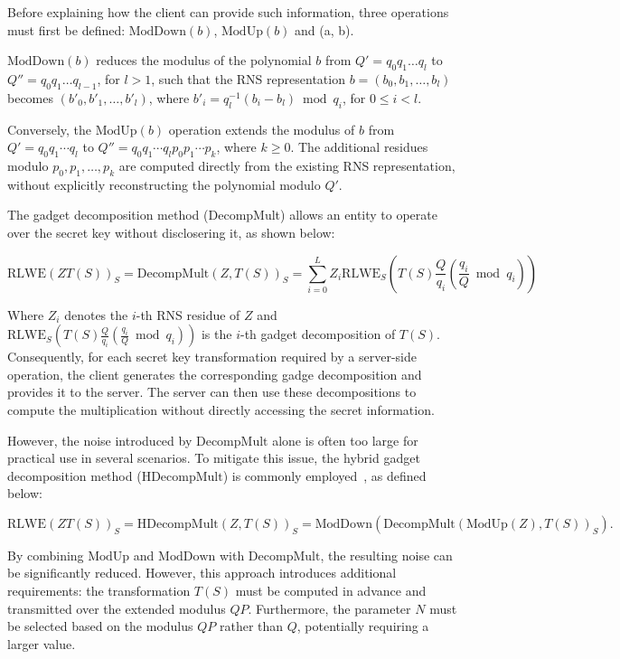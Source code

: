 Before explaining how the client can provide such information, three operations must first be defined: $\text{ModDown}(b)$, $\text{ModUp}(b)$ and (a, b).

$\text{ModDown}(b)$ reduces the modulus of the polynomial $b$ from $Q' = q_0q_1\ldots q_l$ to $Q''=q_0q_1\ldots q_{l-1}$, for $l>1$, such that the RNS representation $b=(b_0,b_1,\ldots,b_l)$ becomes $(b'_0, b'_1, \ldots, b'_l)$, where $b'_i=q_l^{-1}(b_i - b_l) \bmod q_i$, for $0 \leq i < l$.

Conversely, the $\text{ModUp}(b)$ operation extends the modulus of $b$ from $Q'=q_0q_1\cdots q_l$ to $Q''=q_0q_1\cdots q_lp_0p_1\cdots p_k$, where $k\geq0$. The additional residues modulo $p_0,p_1,\ldots,p_k$ are computed directly from the existing RNS representation, without explicitly reconstructing the polynomial modulo $Q'$.

The gadget decomposition method (DecompMult) allows an entity to operate over the secret key without disclosering it, as shown below:

\begin{equation*}
    \text{RLWE}(ZT(S))_S = \text{DecompMult}(Z, T(S))_S = \sum_{i=0}^LZ_i\text{RLWE}_S\left(T(S)\frac{Q}{q_i}\left( \frac{q_i}{Q} \bmod q_i \right)\right)
\end{equation*}

Where $Z_i$ denotes the $i$-th RNS residue of $Z$ and $\text{RLWE}_S\left(T(S)\frac{Q}{q_i}\left( \frac{q_i}{Q} \bmod q_i \right)\right)$ is the $i$-th gadget decomposition of $T(S)$. Consequently, for each secret key transformation required by a server-side operation, the client generates the corresponding gadge decomposition and provides it to the server. The server can then use these decompositions to compute the multiplication without directly accessing the secret information.

However, the noise introduced by $\text{DecompMult}$ alone is often too large for practical use in several scenarios. To mitigate this issue, the hybrid gadget decomposition method ($\text{HDecompMult}$) is commonly employed~\cite{han2020better}, as defined below:

\begin{equation*}
    \text{RLWE}(ZT(S))_S = \text{HDecompMult}(Z, T(S))_S = \text{ModDown}(\text{DecompMult}(\text{ModUp}(Z), T(S))_S).
\end{equation*}

By combining $\text{ModUp}$ and $\text{ModDown}$ with $\text{DecompMult}$, the resulting noise can be significantly reduced. However, this approach introduces additional requirements: the transformation $T(S)$ must be computed in advance and transmitted over the extended modulus $QP$. Furthermore, the parameter $N$ must be selected based on the modulus $QP$ rather than $Q$, potentially requiring a larger value.

